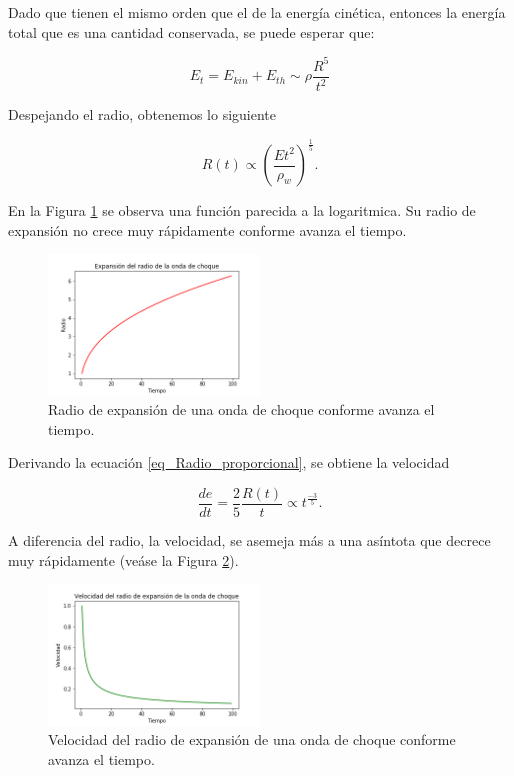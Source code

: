 \documentclass[12pt,a4paper]{book}
\begin{document}
\noindent Dado que tienen el mismo orden que el de la energía cinética, entonces la energía total que es una cantidad conservada, se puede esperar que:

\begin{equation}
  E_t = E_{kin} + E_{th} \sim \rho \frac{R^5}{t^2}
\end{equation}

\noindent Despejando el radio, obtenemos lo siguiente

\begin{equation} \label{eq_Radio_proporcional}
  R(t) \varpropto \left(\frac{E t^2}{\rho_w}\right)^{\frac{1}{5}}.
\end{equation}

\noindent En la Figura \ref{fig_Radio_v_tiempo} se observa una función parecida a la logaritmica. Su radio de expansión no crece muy rápidamente conforme avanza el tiempo.

\begin{figure}
  \centering
    \includegraphics[width=0.5\textwidth]{Figuras/Teoria/Radio_vs_tiempo.png}
  \caption{Radio de expansión de una onda de choque conforme avanza el tiempo. } \label{fig_Radio_v_tiempo}
\end{figure}

Derivando la ecuación \ref{eq_Radio_proporcional}, se obtiene la velocidad

\begin{equation}
  \dfrac{de}{dt} = \frac{2}{5}\frac{R(t)}{t} \varpropto t^{\frac{-3}{5}}.
\end{equation}

\noindent A diferencia del radio, la velocidad, se asemeja más a una asíntota que decrece muy rápidamente (veáse la Figura \ref{fig_velocidad_vs_radio}).

\begin{figure}
  \centering
    \includegraphics[width=0.5\textwidth]{Figuras/Teoria/Velocidad_vs_tiempo.png}
  \caption{Velocidad del radio de expansión de una onda de choque conforme avanza el tiempo. } \label{fig_velocidad_vs_radio}
\end{figure}
\end{document}
